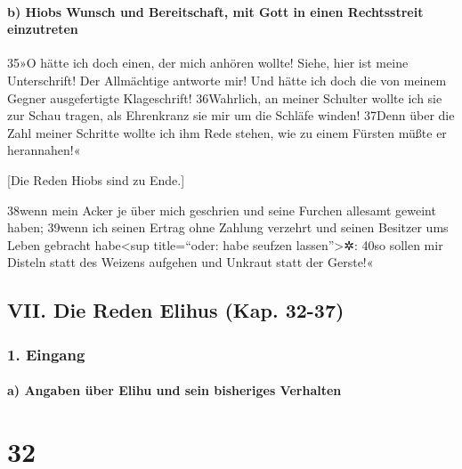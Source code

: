 \hypertarget{b-hiobs-wunsch-und-bereitschaft-mit-gott-in-einen-rechtsstreit-einzutreten}{%
\paragraph{b) Hiobs Wunsch und Bereitschaft, mit Gott in einen
Rechtsstreit
einzutreten}\label{b-hiobs-wunsch-und-bereitschaft-mit-gott-in-einen-rechtsstreit-einzutreten}}

35»O hätte ich doch einen, der mich anhören wollte! Siehe, hier ist
meine Unterschrift! Der Allmächtige antworte mir! Und hätte ich doch die
von meinem Gegner ausgefertigte Klageschrift! 36Wahrlich, an meiner
Schulter wollte ich sie zur Schau tragen, als Ehrenkranz sie mir um die
Schläfe winden! 37Denn über die Zahl meiner Schritte wollte ich ihm Rede
stehen, wie zu einem Fürsten müßte er herannahen!«

{[}Die Reden Hiobs sind zu Ende.{]}

38wenn mein Acker je über mich geschrien und seine Furchen allesamt
geweint haben; 39wenn ich seinen Ertrag ohne Zahlung verzehrt und seinen
Besitzer ums Leben gebracht habe\textless sup title=``oder: habe seufzen
lassen''\textgreater✲: 40so sollen mir Disteln statt des Weizens
aufgehen und Unkraut statt der Gerste!«

\hypertarget{vii.-die-reden-elihus-kap.-32-37}{%
\subsection{VII. Die Reden Elihus (Kap.
32-37)}\label{vii.-die-reden-elihus-kap.-32-37}}

\hypertarget{eingang}{%
\subsubsection{1. Eingang}\label{eingang}}

\hypertarget{a-angaben-uxfcber-elihu-und-sein-bisheriges-verhalten}{%
\paragraph{a) Angaben über Elihu und sein bisheriges
Verhalten}\label{a-angaben-uxfcber-elihu-und-sein-bisheriges-verhalten}}

\hypertarget{section-31}{%
\section{32}\label{section-31}}


